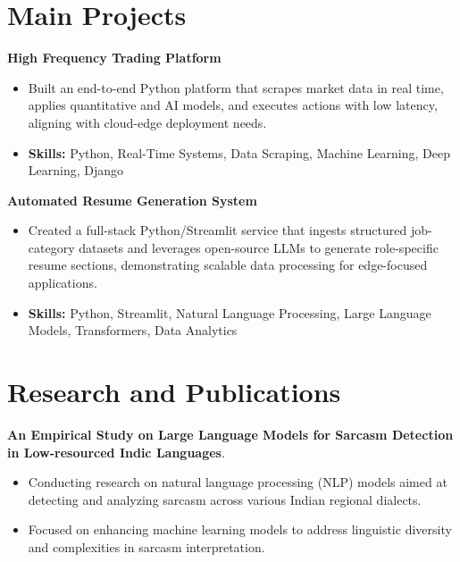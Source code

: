 \documentclass[a4paper,11pt]{article}
\begin{document}
\section{\textbf{Main Projects}}

\vspace{1mm}
  \textbf{High Frequency Trading Platform  }
\vspace{-1.5mm} %
\begin{itemize}
  \item Built an end-to-end Python platform that scrapes market data in real time, applies quantitative and AI models, and executes actions with low latency, aligning with cloud-edge deployment needs.
\vspace{-3mm}
  \item \textbf{Skills:} Python, Real-Time Systems, Data Scraping, Machine Learning, Deep Learning, Django
\end{itemize}


\vspace{1mm}
   \textbf{Automated Resume Generation System }
\vspace{-1.5mm} %
\begin{itemize}
  \item Created a full-stack Python/Streamlit service that ingests structured job-category datasets and leverages open-source LLMs to generate role-specific resume sections, demonstrating scalable data processing for edge-focused applications.
\vspace{-3mm}
  \item \textbf{Skills:} Python, Streamlit, Natural Language Processing, Large Language Models, Transformers, Data Analytics
\end{itemize}



\section{\textbf{Research and Publications} \hfill }
\vspace{1mm}
  \textbf{An Empirical Study on Large Language Models for Sarcasm Detection in Low-resourced Indic Languages}.
\vspace{-1mm} %
\begin{itemize}
  \item Conducting research on natural language processing (NLP) models aimed at detecting and analyzing sarcasm across various Indian regional dialects.
\vspace{-3mm}
  \item Focused on enhancing machine learning models to address linguistic diversity and complexities in sarcasm interpretation.
\end{itemize}
\end{document}
